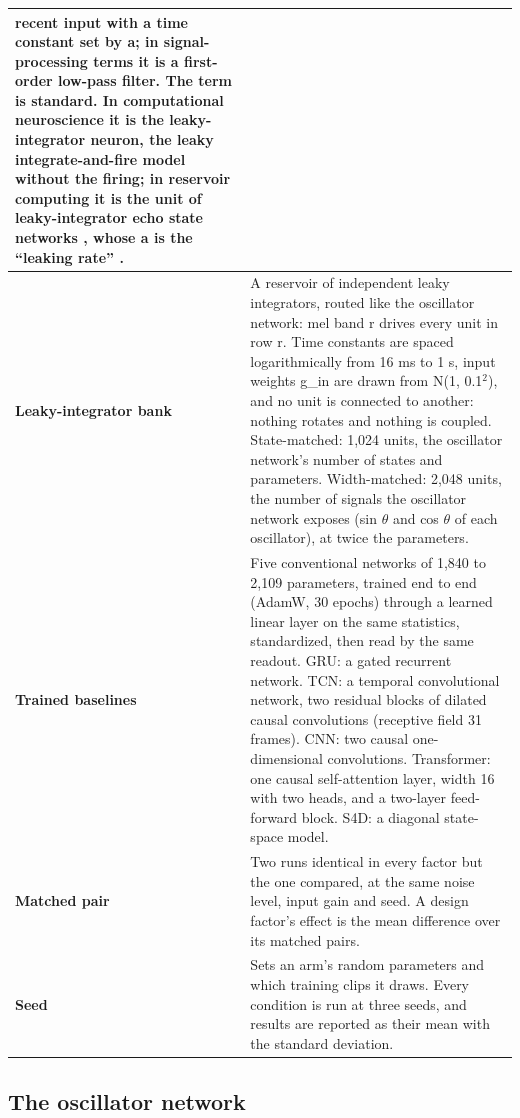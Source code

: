 \documentclass[10pt]{article}
\begin{document}
{\begin{longtable}[]{@{}
  >{\raggedright\arraybackslash}p{}
  >{\raggedright\arraybackslash}p{}@{}}
recent input with a time constant set by a; in signal-processing terms
it is a first-order low-pass filter. The term is standard. In
computational neuroscience it is the leaky-integrator neuron, the leaky
integrate-and-fire model without the firing; in reservoir computing it
is the unit of leaky-integrator echo state networks \citep{jaeger2007},
whose a is the ``leaking rate'' \citep{lukosevicius2012}. \\
\cmidrule{1-2}\textbf{Leaky-integrator bank} & A reservoir of
independent leaky integrators, routed like the oscillator network: mel
band r drives every unit in row r. Time constants are spaced
logarithmically from 16 ms to 1 s, input weights g\_in are drawn from
N(1, 0.1\ensuremath{^{2}}), and no unit is connected to another: nothing
rotates and nothing is coupled. State-matched: 1,024 units, the
oscillator network's number of states and parameters. Width-matched:
2,048 units, the number of signals the oscillator network exposes (sin
\ensuremath{\theta} and cos \ensuremath{\theta} of each oscillator), at
twice the parameters. \\
\cmidrule{1-2}\textbf{Trained baselines} & Five conventional networks of
1,840 to 2,109 parameters, trained end to end (AdamW, 30 epochs) through
a learned linear layer on the same statistics, standardized, then read
by the same readout. GRU: a gated recurrent network. TCN: a temporal
convolutional network, two residual blocks of dilated causal
convolutions (receptive field 31 frames). CNN: two causal
one-dimensional convolutions. Transformer: one causal self-attention
layer, width 16 with two heads, and a two-layer feed-forward block. S4D:
a diagonal state-space model. \\
\cmidrule{1-2}\textbf{Matched pair} & Two runs identical in every factor
but the one compared, at the same noise level, input gain and seed. A
design factor's effect is the mean difference over its matched pairs. \\
\cmidrule{1-2}\textbf{Seed} & Sets an arm's random parameters and which
training clips it draws. Every condition is run at three seeds, and
results are reported as their mean with the standard deviation. \\
\end{longtable}
}

\subsection{The oscillator network}\label{the-oscillator-network}
\end{document}
